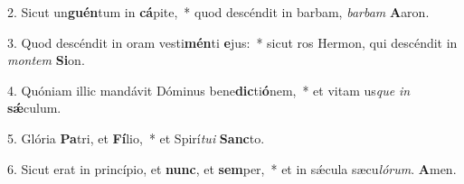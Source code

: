 2. Sicut un\textbf{guén}tum in \textbf{cá}pite,~*  quod descéndit in barbam, \textit{bar}\textit{bam} \textbf{A}aron.\

3. Quod descéndit in oram vesti\textbf{mén}ti \textbf{e}jus:~*  sicut ros Hermon, qui descéndit in \textit{mon}\textit{tem} \textbf{Si}on.\

4. Quóniam illic mandávit Dóminus bene\textbf{dic}ti\textbf{ó}nem,~*  et vitam us\textit{que} \textit{in} \textbf{sǽ}culum.\

5. Glória \textbf{Pa}tri, et \textbf{Fí}lio,~*  et Spirí\textit{tu}\textit{i} \textbf{Sanc}to.\

6. Sicut erat in princípio, et \textbf{nunc}, et \textbf{sem}per,~*  et in sǽcula sæcu\textit{ló}\textit{rum}. \textbf{A}men.\

